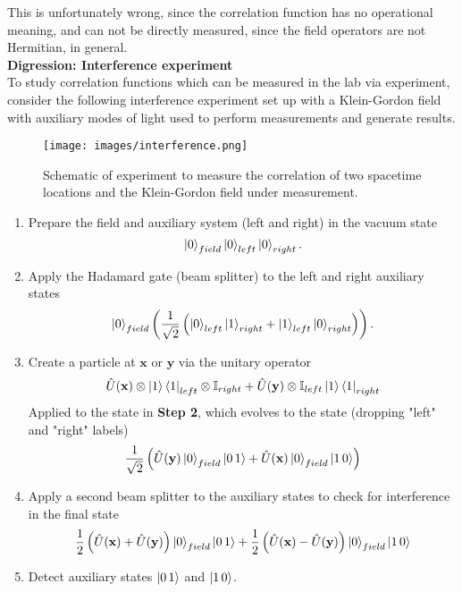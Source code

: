 \noindent This is unfortunately wrong, since the correlation function has no operational meaning, and can not be directly measured, since the field operators are not Hermitian, in general. \\

\noindent \textbf{Digression: Interference experiment} \\

\noindent To study correlation functions which can be measured in the lab via experiment, consider the following interference experiment set up with a Klein-Gordon field with auxiliary modes of light used to perform measurements and generate results. \\

\begin{figure}[H]
	\centering
	\texttt{[image: images/interference.png]}
	\caption{Schematic of experiment to measure the correlation of two spacetime locations and the Klein-Gordon field under measurement.}
\end{figure}

\begin{enumerate}
\item Prepare the field and auxiliary system (left and right) in the vacuum state
	\begin{equation}
	\ket{0}_{field} \ket{0}_{left} \ket{0}_{right}.
	\end{equation}
\item Apply the Hadamard gate (beam splitter) to the left and right auxiliary states
	\begin{equation}
	\ket{0}_{field} \left( \frac{1}{\sqrt{2}} \left( \ket{0}_{left} \ket{1}_{right} + \ket{1}_{left} \ket{0}_{right} \right) \right).
	\end{equation}
\item Create a particle at $\textbf{x}$ or $\textbf{y}$ via the unitary operator
	\begin{equation}
	\hat{U}(\textbf{x}) \otimes \ket{1}\bra{1}_{left} \otimes \mathbb{I}_{right} + \hat{U}(\textbf{y}) \otimes \mathbb{I}_{left} \ket{1}\bra{1}_{right}
	\end{equation}
	Applied to the state in \textbf{Step 2}, which evolves to the state (dropping "left" and "right" labels)
	\begin{equation}
	\frac{1}{\sqrt{2}} \left( \hat{U}(\textbf{y}) \ket{0}_{field} \ket{0 \, 1} + \hat{U}(\textbf{x}) \ket{0}_{field} \ket{1 \, 0} \right)
	\end{equation}
\item Apply a second beam splitter to the auxiliary states to check for interference in the final state
	\begin{equation}
	\frac{1}{2} \left( \hat{U}(\textbf{x}) + \hat{U}(\textbf{y}) \right) \ket{0}_{field} \ket{0 \, 1} + \frac{1}{2} \left( \hat{U}(\textbf{x}) - \hat{U}(\textbf{y}) \right) \ket{0}_{field} \ket{1 \, 0}
	\end{equation}
\item Detect auxiliary states $\ket{0 \, 1}$ and $\ket{1 \, 0}$.  
\end{enumerate}

